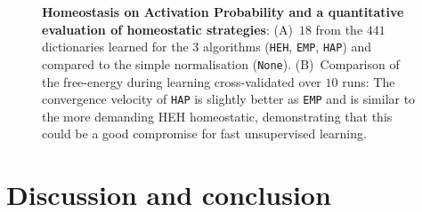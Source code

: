 \documentclass[a4paper, 11pt, draft]{article} %
\newcommand{\seeFig}[1]{Figure~\ref{fig:#1}}%
\begin{document}
\begin{figure}[!ht]%
\caption{
{\bf Homeostasis on Activation Probability and a quantitative evaluation of homeostatic strategies}: %
 {\sf (A)}~$18$ from the $441$ dictionaries learned for the 3 algorithms (\texttt{HEH}, \texttt{EMP}, \texttt{HAP}) and compared to the simple normalisation (\texttt{None}). {\sf (B)}~Comparison of the free-energy during learning cross-validated over $10$ runs: The convergence velocity of \texttt{HAP} is slightly better as \texttt{EMP} and is similar to the more demanding HEH homeostatic, demonstrating that this could be a good compromise for fast unsupervised learning.
\label{fig:HAP}}%
\end{figure}%

\section{Discussion and conclusion}\label{discussion-et-conclusion}
%
%
\end{document}
